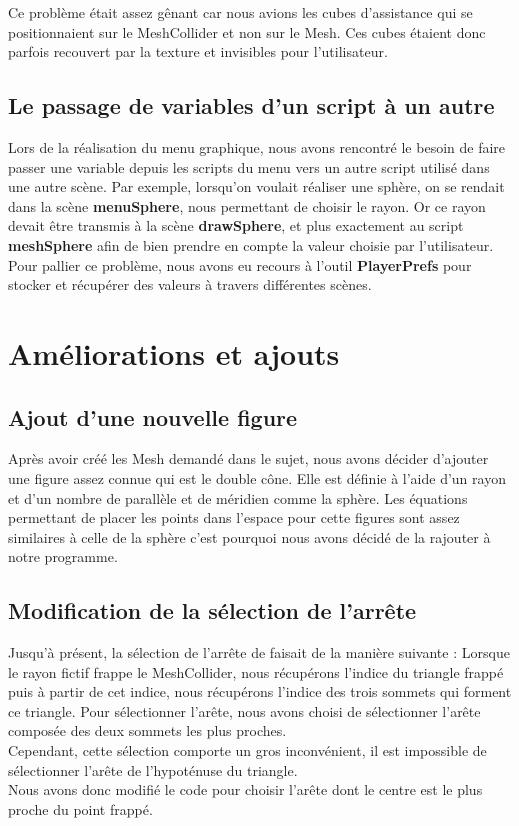 \documentclass[a4paper,oneside,12pt,titlepage]{article}
\begin{document}
Ce problème était assez gênant car nous avions les cubes d'assistance qui se positionnaient sur le MeshCollider et non sur le Mesh. Ces cubes étaient donc parfois recouvert par la texture et invisibles pour l'utilisateur.


\subsection{Le passage de variables d'un script à un autre}

Lors de la réalisation du menu graphique, nous avons rencontré le besoin de faire passer une variable depuis les scripts du menu vers un autre script utilisé dans une autre scène. Par exemple, lorsqu'on voulait réaliser une sphère, on se rendait dans la scène \textbf{menuSphere}, nous permettant de choisir le rayon. Or ce rayon devait être transmis à la scène \textbf{drawSphere}, et plus exactement au script \textbf{meshSphere} afin de bien prendre en compte la valeur choisie par l'utilisateur. Pour pallier ce problème, nous avons eu recours à l'outil \textbf{PlayerPrefs} pour stocker et récupérer des valeurs à travers différentes scènes.

\section{Améliorations et ajouts}

\subsection{Ajout d'une nouvelle figure}
Après avoir créé les Mesh demandé dans le sujet, nous avons décider d'ajouter une figure assez connue qui est le double cône. Elle est définie à l'aide d'un rayon et d'un nombre de parallèle et de méridien comme la sphère. Les équations permettant de placer les points dans l'espace pour cette figures sont assez similaires à celle de la sphère c'est pourquoi nous avons décidé de la rajouter à notre programme. 

\subsection{Modification de la sélection de l'arrête}
Jusqu'à présent, la sélection de l'arrête de faisait de la manière suivante : Lorsque le rayon fictif frappe le MeshCollider, nous récupérons l'indice du triangle frappé puis à partir de cet indice, nous récupérons l'indice des trois sommets qui forment ce triangle. Pour sélectionner l'arête, nous avons choisi de sélectionner l'arête composée des deux sommets les plus proches. 
\\Cependant, cette sélection comporte un gros inconvénient, il est impossible de sélectionner l'arête de l'hypoténuse du triangle. \\
Nous avons donc modifié le code pour choisir l'arête dont le centre est le plus proche du point frappé.
\end{document}
